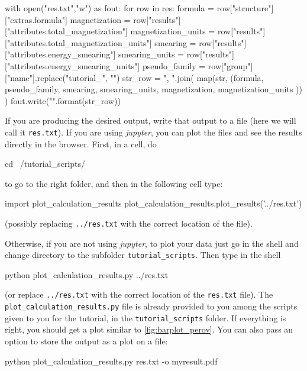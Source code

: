\begin{pythoncommand}
with open("res.txt","w") as fout:
  for row in res:
    formula = row["structure"]["extras.formula"]
    magnetization = row["results"]["attributes.total_magnetization"]
    magnetization_units = row["results"]["attributes.total_magnetization_units"]
    smearing = row["results"]["attributes.energy_smearing"]
    smearing_units = row["results"]["attributes.energy_smearing_units"]
    pseudo_family = row["group"]["name"].replace("tutorial_", "")
    str_row = ", ".join(
            map(str, (formula, pseudo_family,
            smearing, smearing_units, magnetization, magnetization_units
        ))
    	)
    fout.write("{}\n".format(str_row))

\end{pythoncommand}
\fi


If you are producing the desired output, write that output to a file (here we will call it \texttt{res.txt}).
If you are using \emph{jupyter}, you can plot the files and see the results directly in the browser. First, in a cell, do
\begin{pythoncommand}
cd ~/tutorial_scripts/
\end{pythoncommand}
to go to the right folder, and then in the following cell type:
\begin{pythoncommand}
import plot_calculation_results
plot_calculation_results.plot_results('../res.txt')
\end{pythoncommand}
(possibly replacing \texttt{../res.txt} with the correct location of the file).

Otherwise, if you are not using \emph{jupyter}, to plot your data just go in the shell and change directory to the subfolder \texttt{tutorial\_scripts}. Then type in the shell
\begin{bashcommand}
python plot_calculation_results.py ../res.txt
\end{bashcommand}
(or replace \texttt{../res.txt} with the correct location of the \texttt{res.txt} file). The \texttt{plot\_calculation\_results.py} file is already provided to you among the scripts given to you for the tutorial, in the \texttt{tutorial\_scripts} folder. If everything is right, you should get a plot similar to \autoref{fig:barplot_perov}.
You can also pass an option to store the output as a plot on a file:
\begin{bashcommand}
python plot_calculation_results.py res.txt -o myresult.pdf
\end{bashcommand}



